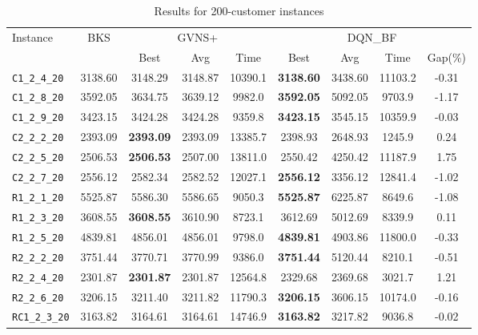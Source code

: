 \begin{table}[ht]
\centering
\small
\setlength{\tabcolsep}{5pt}
\caption{Results for 200-customer instances}
\vspace{4mm}
\begin{adjustbox}{width=\textwidth}
\begin{tabular}{l c c c c @{\hspace{8pt}} c c c c @{\hspace{8pt}}}
\toprule
\multirow{2}{*}{Instance} & \multirow{2}{*}{BKS} & \multicolumn{3}{c}{GVNS+} & \multicolumn{4}{c}{DQN\_BF} \\
\cmidrule(lr){3-5} \cmidrule(lr){6-9}
 &  & Best & Avg & Time & Best & Avg & Time & Gap(\%) \\
\midrule
\texttt{C1\_2\_4\_20} & 3138.60 & 3148.29 & 3148.87 & 10390.1 & \textbf{3138.60} & 3438.60 & 11103.2 & -0.31 \\
\texttt{C1\_2\_8\_20} & 3592.05 & 3634.75 & 3639.12 & 9982.0 & \textbf{3592.05} & 5092.05 & 9703.9 & -1.17 \\
\texttt{C1\_2\_9\_20} & 3423.15 & 3424.28 & 3424.28 & 9359.8 & \textbf{3423.15} & 3545.15 & 10359.9 & -0.03 \\
\texttt{C2\_2\_2\_20} & 2393.09 & \textbf{2393.09} & 2393.09 & 13385.7 & 2398.93 & 2648.93 & 1245.9 & 0.24 \\
\texttt{C2\_2\_5\_20} & 2506.53 & \textbf{2506.53} & 2507.00 & 13811.0 & 2550.42 & 4250.42 & 11187.9 & 1.75 \\
\texttt{C2\_2\_7\_20} & 2556.12 & 2582.34 & 2582.52 & 12027.1 & \textbf{2556.12} & 3356.12 & 12841.4 & -1.02 \\
\texttt{R1\_2\_1\_20} & 5525.87 & 5586.30 & 5586.65 & 9050.3 & \textbf{5525.87} & 6225.87 & 8649.6 & -1.08 \\
\texttt{R1\_2\_3\_20} & 3608.55 & \textbf{3608.55} & 3610.90 & 8723.1 & 3612.69 & 5012.69 & 8339.9 & 0.11 \\
\texttt{R1\_2\_5\_20} & 4839.81 & 4856.01 & 4856.01 & 9798.0 & \textbf{4839.81} & 4903.86 & 11800.0 & -0.33 \\
\texttt{R2\_2\_2\_20} & 3751.44 & 3770.71 & 3770.99 & 9386.0 & \textbf{3751.44} & 5120.44 & 8210.1 & -0.51 \\
\texttt{R2\_2\_4\_20} & 2301.87 & \textbf{2301.87} & 2301.87 & 12564.8 & 2329.68 & 2369.68 & 3021.7 & 1.21 \\
\texttt{R2\_2\_6\_20} & 3206.15 & 3211.40 & 3211.82 & 11790.3 & \textbf{3206.15} & 3606.15 & 10174.0 & -0.16 \\
\texttt{RC1\_2\_3\_20} & 3163.82 & 3164.61 & 3164.61 & 14746.9 & \textbf{3163.82} & 3217.82 & 9036.8 & -0.02 \\

\end{tabular}
\end{adjustbox}
\end{table}
